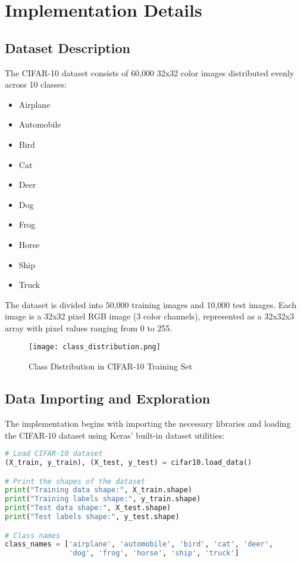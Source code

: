 \documentclass[12pt]{article}
\begin{document}
\section{Implementation Details}

\subsection{Dataset Description}
The CIFAR-10 dataset consists of 60,000 32x32 color images distributed evenly across 10 classes:
\begin{itemize}
    \item Airplane
    \item Automobile
    \item Bird
    \item Cat
    \item Deer
    \item Dog
    \item Frog
    \item Horse
    \item Ship
    \item Truck
\end{itemize}

The dataset is divided into 50,000 training images and 10,000 test images. Each image is a 32x32 pixel RGB image (3 color channels), represented as a 32x32x3 array with pixel values ranging from 0 to 255.

\begin{figure}[h]
    \centering
    \texttt{[image: class\_distribution.png]}
    \caption{Class Distribution in CIFAR-10 Training Set}
\end{figure}

\subsection{Data Importing and Exploration}
The implementation begins with importing the necessary libraries and loading the CIFAR-10 dataset using Keras' built-in dataset utilities:

\begin{lstlisting}[language=Python, caption=Loading and Exploring the CIFAR-10 Dataset]
# Load CIFAR-10 dataset
(X_train, y_train), (X_test, y_test) = cifar10.load_data()

# Print the shapes of the dataset
print("Training data shape:", X_train.shape)
print("Training labels shape:", y_train.shape)
print("Test data shape:", X_test.shape)
print("Test labels shape:", y_test.shape)

# Class names
class_names = ['airplane', 'automobile', 'bird', 'cat', 'deer', 
               'dog', 'frog', 'horse', 'ship', 'truck']
\end{lstlisting}
\end{document}
